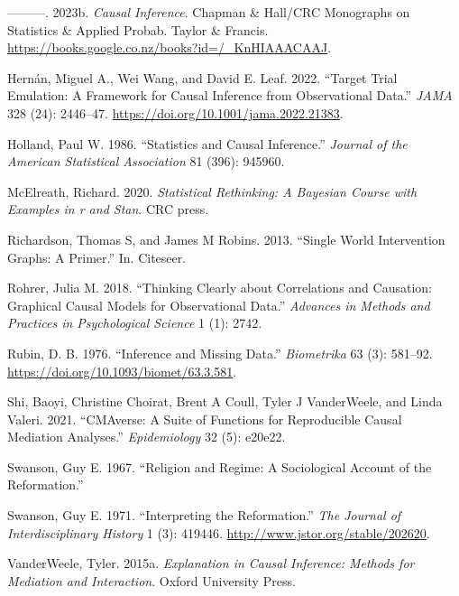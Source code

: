 \documentclass[
  singlecolumn]{report}
\newlength{\cslhangindent}
\newlength{\cslentryspacingunit} %
\newenvironment{CSLReferences}[2] %
 {%
  \setlength{\parindent}{0pt}
  \ifodd #1
  \let\oldpar\par
  \def\par{\hangindent=\cslhangindent\oldpar}
  \fi
  \setlength{\parskip}{#2\cslentryspacingunit}
 }%
 {}
\begin{document}
\begin{CSLReferences}{1}{0}
\leavevmode{}%
---------. 2023b. \emph{Causal Inference}. Chapman \& Hall/CRC
Monographs on Statistics \& Applied Probab. Taylor \& Francis.
\url{https://books.google.co.nz/books?id=/_KnHIAAACAAJ}.

\leavevmode{}%
Hernán, Miguel A., Wei Wang, and David E. Leaf. 2022. {``Target Trial
Emulation: A Framework for Causal Inference from Observational Data.''}
\emph{JAMA} 328 (24): 2446--47.
\url{https://doi.org/10.1001/jama.2022.21383}.

\leavevmode{}%
Holland, Paul W. 1986. {``Statistics and Causal Inference.''}
\emph{Journal of the American Statistical Association} 81 (396): 945960.

\leavevmode{}%
McElreath, Richard. 2020. \emph{Statistical Rethinking: A Bayesian
Course with Examples in r and Stan}. CRC press.

\leavevmode{}%
Richardson, Thomas S, and James M Robins. 2013. {``Single World
Intervention Graphs: A Primer.''} In. Citeseer.

\leavevmode{}%
Rohrer, Julia M. 2018. {``Thinking Clearly about Correlations and
Causation: Graphical Causal Models for Observational Data.''}
\emph{Advances in Methods and Practices in Psychological Science} 1 (1):
2742.

\leavevmode{}%
Rubin, D. B. 1976. {``Inference and Missing Data.''} \emph{Biometrika}
63 (3): 581--92. \url{https://doi.org/10.1093/biomet/63.3.581}.

\leavevmode{}%
Shi, Baoyi, Christine Choirat, Brent A Coull, Tyler J VanderWeele, and
Linda Valeri. 2021. {``CMAverse: A Suite of Functions for Reproducible
Causal Mediation Analyses.''} \emph{Epidemiology} 32 (5): e20e22.

\leavevmode{}%
Swanson, Guy E. 1967. {``Religion and Regime: A Sociological Account of
the Reformation.''}

\leavevmode{}%
Swanson, Guy E. 1971. {``Interpreting the Reformation.''} \emph{The
Journal of Interdisciplinary History} 1 (3): 419446.
\url{http://www.jstor.org/stable/202620}.

\leavevmode{}%
VanderWeele, Tyler. 2015a. \emph{Explanation in Causal Inference:
Methods for Mediation and Interaction}. Oxford University Press.


\end{CSLReferences}
\end{document}
